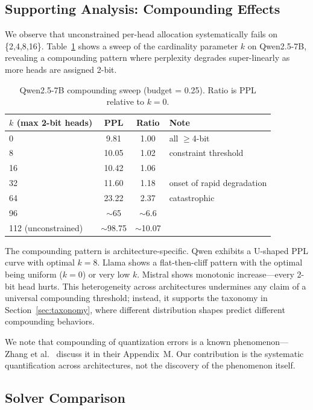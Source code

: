 \documentclass[11pt,a4paper]{article}
\begin{document}
\subsection{Supporting Analysis: Compounding Effects}\label{sec:compounding}

We observe that unconstrained per-head allocation systematically fails on \{2,4,8,16\}.
Table~\ref{tab:compounding} shows a sweep of the cardinality parameter $k$ on Qwen2.5-7B, revealing a compounding pattern where perplexity degrades super-linearly as more heads are assigned 2-bit.

\begin{table}[h]
\centering
\caption{Qwen2.5-7B compounding sweep (budget = 0.25). Ratio is PPL relative to $k\!=\!0$.}
\label{tab:compounding}
\small
\begin{tabular}{lccl}
\toprule
$k$ (max 2-bit heads) & PPL & Ratio & Note \\
\midrule
0 & 9.81 & 1.00 & all $\geq$4-bit \\
8 & 10.05 & 1.02 & constraint threshold \\
16 & 10.42 & 1.06 & \\
32 & 11.60 & 1.18 & onset of rapid degradation \\
64 & 23.22 & 2.37 & catastrophic \\
96 & $\sim$65 & $\sim$6.6 & \\
112 (unconstrained) & $\sim$98.75 & $\sim$10.07 & \\
\bottomrule
\end{tabular}
\end{table}

The compounding pattern is architecture-specific.
Qwen exhibits a U-shaped PPL curve with optimal $k\!=\!8$.
Llama shows a flat-then-cliff pattern with the optimal being uniform ($k\!=\!0$) or very low $k$.
Mistral shows monotonic increase---every 2-bit head hurts.
This heterogeneity across architectures undermines any claim of a universal compounding threshold; instead, it supports the taxonomy in Section~\ref{sec:taxonomy}, where different distribution shapes predict different compounding behaviors.

We note that compounding of quantization errors is a known phenomenon---Zhang et al.~\cite{zhang2024ratequant} discuss it in their Appendix~M.
Our contribution is the systematic quantification across architectures, not the discovery of the phenomenon itself.

\subsection{Solver Comparison}\label{sec:solver}
\end{document}
